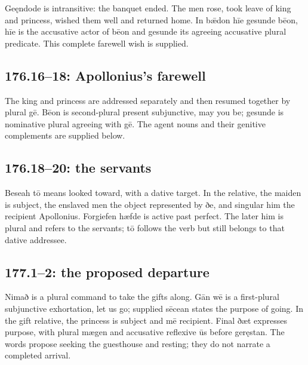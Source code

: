 Geęndode is intransitive: the banquet ended. The men rose, took leave of king and princess, wished them well and returned home. In bǣdon hīe gesunde bēon, hīe is the accusative actor of bēon and gesunde its agreeing accusative plural predicate. This complete farewell wish is supplied.

\subsection*{176.16–18: Apollonius’s farewell}

The king and princess are addressed separately and then resumed together by plural gē. Bēon is second-plural present subjunctive, may you be; gesunde is nominative plural agreeing with gē. The agent nouns and their genitive complements are supplied below.

\subsection*{176.18–20: the servants}

Beseah tō means looked toward, with a dative target. In the relative, the maiden is subject, the enslaved men the object represented by ðe, and singular him the recipient Apollonius. Forgiefen hæfde is active past perfect. The later him is plural and refers to the servants; tō follows the verb but still belongs to that dative addressee.

\subsection*{177.1–2: the proposed departure}

Nimað is a plural command to take the gifts along. Gān wē is a first-plural subjunctive exhortation, let us go; supplied sēcean states the purpose of going. In the gift relative, the princess is subject and mē recipient. Final ðæt expresses purpose, with plural mægen and accusative reflexive ūs before geręstan. The words propose seeking the guesthouse and resting; they do not narrate a completed arrival.


